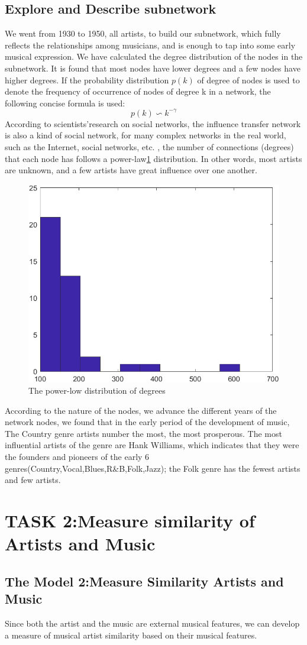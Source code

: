 \documentclass[conference]{IEEEtran}
\begin{document}
\subsection{Explore and Describe subnetwork}
We went from 1930 to 1950, all artists, to build our subnetwork, which fully reflects the relationships among musicians, and is enough to tap into some early musical expression.
We have calculated the degree distribution of the nodes in the subnetwork. It is found that most nodes have lower degrees and a few nodes have higher degrees. If the probability distribution $p (k)$ of degree of nodes is used to denote the frequency of occurrence of nodes of degree k in a network, the following concise formula is used:
\[p(k)\backsim k^{-\gamma}\]
According to scientists’research on social networks, the influence transfer network is also a kind of social network, for many complex networks in the real world, such as the Internet, social networks, etc. , the number of connections (degrees) that each node has follows a power-law\ref{fig:exp} distribution. In other words, most artists are unknown, and a few artists have great influence over one another.
\begin{figure}[htbp]
	\centering
	\includegraphics[width=.3\textwidth]{./img/exp}
	\caption{The power-low distribution of degrees}\label{fig:exp}
\end{figure}

According to the nature of the nodes, we advance the different years of the network nodes, we found that in the early period of the development of music, The Country genre artists number the most, the most prosperous. The most influential artists of the genre are Hank Williams, which indicates that they were the founders and pioneers of the early 6 genres(Country,Vocal,Blues,R\&B,Folk,Jazz); the Folk genre has the fewest artists and few artists.

\section{TASK 2:Measure similarity of Artists and Music}
\subsection{The Model 2:Measure Similarity Artists and Music}
Since both the artist and the music are external musical features, we can develop a measure of musical artist similarity based on their musical features.
\end{document}
